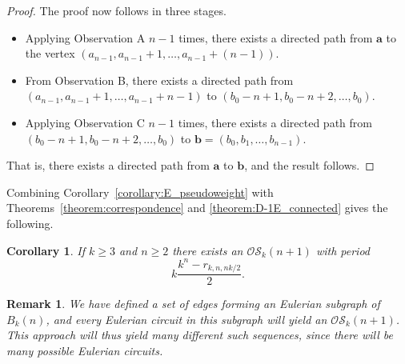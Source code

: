 \documentclass[a4paper,11pt]{article}
\newtheorem{corollary}[lemma]{Corollary}
\newtheorem{remark}[lemma]{Remark}
\begin{document}
\begin{proof}
The proof now follows in three stages.
\begin{itemize}
\item Applying Observation A $n-1$ times, there exists a directed path from $\mathbf{a}$ to
the
    vertex $(a_{n-1},a_{n-1}+1,\ldots,a_{n-1}+(n-1))$.
\item From Observation B, there exists a directed path from
    $(a_{n-1},a_{n-1}+1,\ldots,a_{n-1}+n-1)$ to $(b_0-n+1,b_0-n+2,\ldots,b_0)$.
\item Applying Observation C $n-1$ times, there exists a directed path from
    $(b_0-n+1,b_0-n+2,\ldots,b_0)$ to $\mathbf{b}=(b_0,b_1,\ldots,b_{n-1})$.
\end{itemize}
That is, there exists a directed path from $\mathbf{a}$ to $\mathbf{b}$, and the result follows.
\end{proof}

Combining Corollary~\ref{corollary:E_pseudoweight} with Theorems~\ref{theorem:correspondence} and
\ref{theorem:D-1E_connected} gives the following.

\begin{corollary}  \label{corollary:OS_from_antineg}
If $k\geq3$ and $n\geq 2$ there exists an $\mathcal{OS}_k(n+1)$ with period
\[ k\frac{k^n-r_{k,n,nk/2}}{2}. \]
\end{corollary}

\begin{remark}
We have defined a set of edges forming an Eulerian subgraph of $B_k(n)$, and every Eulerian
circuit
in this subgraph will yield an $\mathcal{OS}_k(n+1)$.  This approach will thus yield many
different
such sequences, since there will be many possible Eulerian circuits.
\end{remark}
\end{document}
